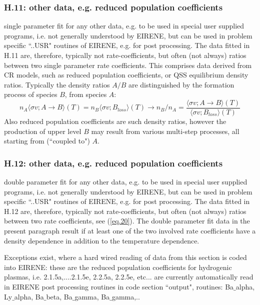 \documentclass[12pt,dvipdfmx]{article}
\begin{document}
\subsubsection{H.11: other data, e.g. reduced population coefficients}\label{sec1.3.11}
single parameter fit for any other data, e.g.
to be used in special user supplied
programs, i.e. not generally understood by EIRENE, but can be used in problem
specific ``..USR" routines of EIRENE, e.g. for post processing.
The data fitted in H.11 are, therefore, typically not rate-coefficients,
but often (not always) ratios between two single parameter rate coefficients.
This comprises data derived from CR models, such as reduced population coefficients, or
QSS equilibrium density ratios.
Typically the density ratios $A/B$ are distinguished by the formation process
of species $B$, from species $A$:
\begin{equation}\label{eq.20}
n_A \langle \sigma v; A \rightarrow B\rangle(T)  = n_B \langle \sigma v; B_{loss}\rangle(T)    \rightarrow n_B/n_A = \frac{\langle \sigma v; A \rightarrow B\rangle(T)}{\langle \sigma v; B_{loss}\rangle(T)}
\end{equation}
Also reduced population coefficients are such density ratios, however the production of upper level $B$
may result from various multi-step processes, all starting from  (``coupled to") $A$.
\subsubsection{H.12: other data, e.g. reduced population coefficients}\label{sec1.3.12}
double parameter fit for any other data, e.g.
to be used in special user supplied
programs, i.e. not generally understood by EIRENE, but can be used in problem
specific ``..USR" routines of EIRENE, e.g. for post processing.
The data fitted in H.12 are, therefore, typically not rate-coefficients,
but often (not always) ratios between two rate coefficients, see (\ref{eq.20}).
The double parameter fit data in the present paragraph result if at least one of the two
involved rate coefficients have a density dependence in addition to the temperature dependence.




Exceptions exist, where a hard wired reading of data from this section is coded into EIRENE:
these are the reduced population coefficients for hydrogenic plasmas, i.e.
2.1.5a,....2.1.5e, 2.2.5a, 2.2.5e, etc... are currently automatically read in
EIRENE post processing routines in code section ``output", routines: Ba$\_$alpha, Ly$\_$alpha, Ba$\_$beta, Ba$\_$gamma, Ba$\_$gamma,..
\end{document}
